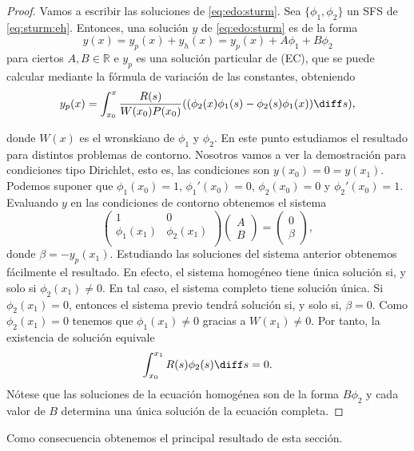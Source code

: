 \documentclass{article}
\begin{document}
\begin{proof}
  Vamos a escribir las soluciones de \eqref{eq:edo:sturm}. Sea $\{\phi_1, \phi_2\}$ un SFS de
  \eqref{eq:sturm:eh}. Entonces, una solución $y$ de \eqref{eq:edo:sturm} es de la forma
  \[y(x) = y_p(x) + y_h(x) = y_p(x) + A \phi_1 + B\phi_2\] para ciertos $A, B \in \mathbb{R}$ e
  $y_p$ es una solución particular de (EC), que se puede calcular mediante la fórmula de variación
  de las constantes, obteniendo
  \[y_p(x) = \int_{x_0}^{x} \frac{R(s)}{W(x_0) P(x_0)} ((\phi_2(x) \phi_1(s) - \phi_2(s) \phi_1(x))
    \diff s),\]

  donde $W(x)$ es el wronskiano de $\phi_1$ y $\phi_2$. En este punto estudiamos el resultado para
  distintos problemas de contorno. Nosotros vamos a ver la demostración para condiciones tipo
  Dirichlet, esto es, las condiciones son $y(x_0) = 0 = y(x_1)$. Podemos suponer que
  $\phi_1(x_0) = 1$, $\phi_1'(x_0) = 0$, $\phi_2(x_0) = 0$ y $\phi_2'(x_0) = 1$. Evaluando $y$ en
  las condiciones de contorno obtenemos el sistema
  \[\left(
      \begin{array}{cc}
        1 & 0 \\ 
        \phi_1(x_1) & \phi_2(x_1) \\
      \end{array}
    \right) \left(
      \begin{array}{c}
        A \\ B
      \end{array}
    \right) = \left(
      \begin{array}{c}
        0 \\ \beta
      \end{array}
    \right),
  \]
  donde $\beta = -y_p(x_1)$. Estudiando las soluciones del sistema anterior obtenemos fácilmente el
  resultado. En efecto, el sistema homogéneo tiene única solución si, y solo si $\phi_2(x_1) \ne
  0$. En tal caso, el sistema completo tiene solución única. Si $\phi_2(x_1) = 0$, entonces el
  sistema previo tendrá solución si, y solo si, $\beta = 0$.  Como $\phi_2(x_1) = 0$ tenemos que
  $\phi_1(x_1) \ne 0$ gracias a $W(x_1) \ne 0$. Por tanto, la existencia de solución equivale
  \[\int_{x_0}^{x_1} R(s) \phi_2(s) \diff s = 0.\]
  Nótese que las soluciones de la ecuación homogénea son de la forma $B \phi_2$ y cada valor de $B$
  determina una única solución de la ecuación completa.
\end{proof}


Como consecuencia obtenemos el principal resultado de esta sección.
\end{document}
